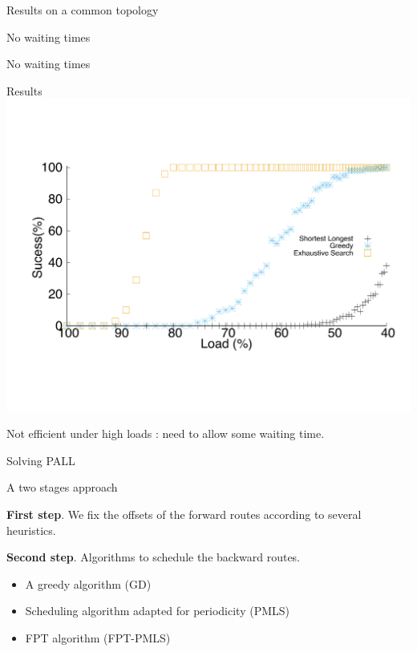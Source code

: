 \documentclass[10 pt]{beamer}
\begin{document}
\begin{section}{Results on a common topology}
\begin{subsection}{No waiting times}
\begin{frame}{No waiting times }
\begin{itemize}
\end{itemize}
\end{frame}


\begin{frame}{Results}
\centering
  \includegraphics[scale=0.4]{echec_longues}\\
  \vspace{1cm}
  
  Not efficient under high loads : need to allow some waiting time.
\end{frame}
\end{subsection}

\begin{subsection}{Solving PALL}
\begin{frame}{A two stages approach}

{\bf First step}. We fix the offsets of the forward routes according to several heuristics.
\vspace{0.5cm}


{\bf Second step}. Algorithms to schedule the backward routes.
\vspace{0.5cm}
\begin{itemize}
	
	 \item A greedy algorithm (GD)
	 \item Scheduling algorithm adapted for periodicity (PMLS)
	 \item FPT algorithm (FPT-PMLS)
	\end{itemize}


\end{frame}
\end{subsection}


\end{section}
\end{document}
